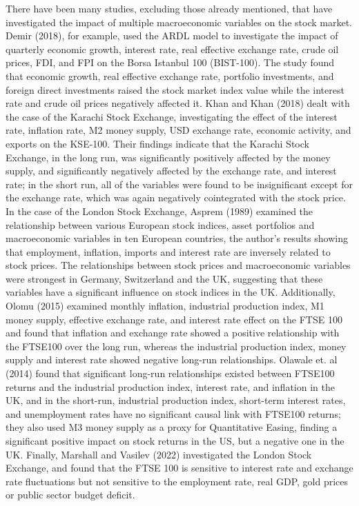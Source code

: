 \documentclass[12pt,a4paper]{article}
\begin{document}
There have been many studies, excluding those already mentioned, that have investigated the impact of multiple macroeconomic variables on the stock market. Demir (2018), for example, used the ARDL model to investigate the impact of quarterly economic growth, interest rate, real effective exchange rate, crude oil prices, FDI, and FPI on the Borsa Istanbul 100 (BIST-100). The study found that economic growth, real effective exchange rate, portfolio investments, and foreign direct investments raised the stock market index value while the interest rate and crude oil prices negatively affected it. Khan and Khan (2018) dealt with the case of the Karachi Stock Exchange, investigating the effect of the interest rate, inflation rate, M2 money supply, USD exchange rate, economic activity, and exports on the KSE-100. Their findings indicate that the Karachi Stock Exchange, in the long run, was significantly positively affected by the money supply, and significantly negatively affected by the exchange rate, and interest rate; in the short run, all of the variables were found to be insignificant except for the exchange rate, which was again negatively cointegrated with the stock price. In the case of the London Stock Exchange, Asprem (1989) examined the relationship between various European stock indices, asset portfolios and macroeconomic variables in ten European countries, the author’s results showing that employment, inflation, imports and interest rate are inversely related to stock prices. The relationships between stock prices and macroeconomic variables were strongest in Germany, Switzerland and the UK, suggesting that these variables have a significant influence on stock indices in the UK. Additionally, Olomu (2015) examined monthly inflation, industrial production index, M1 money supply, effective exchange rate, and interest rate effect on the FTSE 100 and found that inflation and exchange rate showed a positive relationship with the FTSE100 over the long run, whereas the industrial production index, money supply and interest rate showed negative long-run relationships. Olawale et. al (2014) found that significant long-run relationships existed between FTSE100 returns and the industrial production index, interest rate, and inflation in the UK, and in the short-run, industrial production index, short-term interest rates, and unemployment rates have no significant causal link with FTSE100 returns; they also used M3 money supply as a proxy for Quantitative Easing, finding a significant positive impact on stock returns in the US, but a negative one in the UK. Finally, Marshall and Vasilev (2022) investigated the London Stock Exchange, and found that the FTSE 100 is sensitive to interest rate and exchange rate fluctuations but not sensitive to the employment rate, real GDP, gold prices or public sector budget deficit. 
\end{document}
